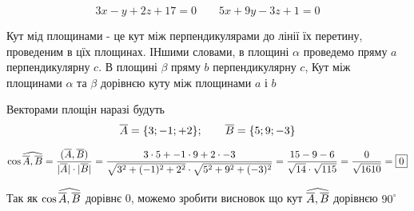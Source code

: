 {}

$$
  3x-y+2z+17=0 \qquad
  5x+9y-3z+1=0
$$

Кут мід площинами - це кут між перпендикулярами до лінії їх перетину, проведеним в цїх площинах. ІНшими словами, в площині $\alpha$ проведемо пряму $a$ перпендикулярну $c$. В площині $\beta$ пряму $b$ перпендикулярну $c$, Кут між площинами $\alpha$ та $\beta$ дорівнєю куту між площинами $a$ і $b$

Векторами площін наразі будуть
$$
\overline{A} = \{3;-1;+2\}; \qquad \overline{B} = \{5;9;-3\}
$$


$$
  \cos{\widehat{ \overline{A} , \overline{B} }}
  = \dfrac{(\overline{A},\overline{B})}{| \overline{A} | \cdot | \overline{B} | }
  = \dfrac{3\cdot 5 + -1\cdot 9 + 2\cdot-3 }{\sqrt{3^2+(-1)^2+2^2} \cdot \sqrt{5^2+9^2+(-3)^2} }
  = \dfrac{15-9-6}{\sqrt{14} \cdot \sqrt{115}}
  = \dfrac{0}{\sqrt{1610}}
  = \boxed{0}
$$

Так як $\cos{\widehat{ \overline{A} , \overline{B} }}$ дорівнє 0, можемо зробити висновок що кут $\widehat{\overline{A},\overline{B}}$  дорівнєю $\boxed{90^{\circ}}$
